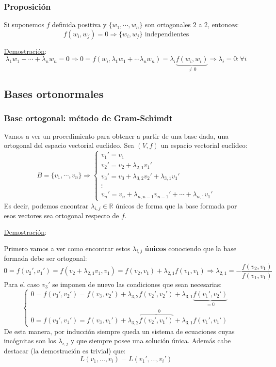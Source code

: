 \documentclass[10pt,a4paper,openright]{book}
\theoremstyle{break}
\begin{document}
\subsubsection*{Proposición}
Si suponemos $f$ definida positiva y $\{w_1, \cdots, w_n\}$ son ortogonales $2$ a $2$, entonces:
$$f(w_i,w_j) = 0\Rightarrow \{w_i, w_j\} \mbox{ independientes}$$

\underline{Demostración}:
$$\lambda_1w_1+\cdots+\lambda_nw_n = 0 \Rightarrow 0 = f(w_i, \lambda_1w_1+\cdots \lambda_nw_n) = \lambda_i\underbrace{f(w_i,w_i)}_{\neq 0}\Rightarrow\lambda_i = 0: \forall i$$

\subsection{Bases ortonormales}
\subsubsection*{Base ortogonal: método de Gram-Schimdt}
Vamos a ver un procedimiento para obtener a partir de una base dada, una ortogonal del espacio vectorial euclideo. Sea $(V,f)$ un espacio vectorial euclídeo:
$$B=\{v_1, \cdots, v_n\}\Rightarrow \begin{cases} v_1' = v_1  \\ v_2' = v_2 + \lambda_{2,1}v_1' \\ v_3' = v_3 + \lambda_{3,2}v_2' + \lambda_{3,1}v_1' \\ \vdots \\ v_n' = v_n + \lambda_{n,n-1}v_{n-1}'+\cdots + \lambda_{n,1}v_1'\end{cases}$$
Es decir, podemos encontrar $\lambda_{i,j}\in \mathbb R$ únicos de forma que la base formada por esos vectores sea ortogonal respecto de $f$.

\underline{Demostración}:

Primero vamos a ver como encontrar estos $\lambda_{i,j}$ \textbf{únicos} conociendo que la base formada debe ser ortogonal:
$$0 = f(v_2',v_1') = f(v_2+\lambda_{2,1}v_1, v_1) = f(v_2,v_1)+\lambda_{2,1}f(v_1,v_1)\Rightarrow \lambda_{2,1} = -\frac{f(v_2,v_1)}{f(v_1,v_1)}$$
Para el caso $v_3'$ se imponen de nuevo las condiciones que sean necesarias:
$$\begin{cases} 0=f(v_3',v_2') = f(v_3,v_2')+\lambda_{3,2}f(v_2',v_2')+\lambda_{3,1}\underbrace{f(v_1',v_2')}_{=0} \\ 0 = f(v_3', v_1') = f(v_3, v_1')+ \lambda_{3,2}\overbrace{f(v_2',v_1')}^{=0}+\lambda_{3,1}f(v_1',v_1') \end{cases}$$
De esta manera, por inducción siempre queda un sistema de ecuaciones cuyas incógnitas son los $\lambda_{i,j}$ y que siempre posee una solución única. Además cabe destacar (la demostración es trivial) que:
$$L(v_1, \ldots, v_i) = L(v_1', \ldots, v_i')$$
\end{document}
